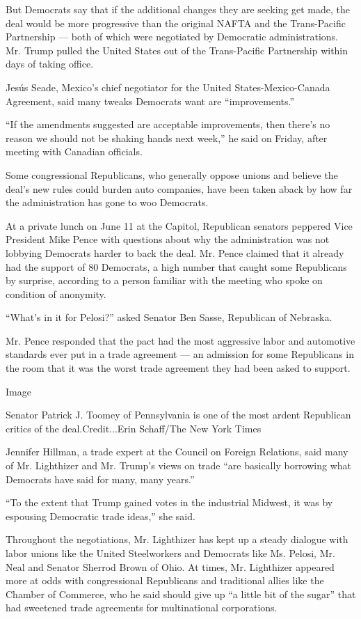 But Democrats say that if the additional changes they are seeking get
made, the deal would be more progressive than the original NAFTA and the
Trans-Pacific Partnership --- both of which were negotiated by
Democratic administrations. Mr. Trump pulled the United States out of
the Trans-Pacific Partnership within days of taking office.

Jesús Seade, Mexico's chief negotiator for the United
States-Mexico-Canada Agreement, said many tweaks Democrats want are
``improvements.''

``If the amendments suggested are acceptable improvements, then there's
no reason we should not be shaking hands next week,'' he said on Friday,
after meeting with Canadian officials.

Some congressional Republicans, who generally oppose unions and believe
the deal's new rules could burden auto companies, have been taken aback
by how far the administration has gone to woo Democrats.

At a private lunch on June 11 at the Capitol, Republican senators
peppered Vice President Mike Pence with questions about why the
administration was not lobbying Democrats harder to back the deal. Mr.
Pence claimed that it already had the support of 80 Democrats, a high
number that caught some Republicans by surprise, according to a person
familiar with the meeting who spoke on condition of anonymity.

``What's in it for Pelosi?'' asked Senator Ben Sasse, Republican of
Nebraska.

Mr. Pence responded that the pact had the most aggressive labor and
automotive standards ever put in a trade agreement --- an admission for
some Republicans in the room that it was the worst trade agreement they
had been asked to support.

Image

Senator Patrick J. Toomey of Pennsylvania is one of the most ardent
Republican critics of the deal.Credit...Erin Schaff/The New York Times

Jennifer Hillman, a trade expert at the Council on Foreign Relations,
said many of Mr. Lighthizer and Mr. Trump's views on trade ``are
basically borrowing what Democrats have said for many, many years.''

``To the extent that Trump gained votes in the industrial Midwest, it
was by espousing Democratic trade ideas,'' she said.

Throughout the negotiations, Mr. Lighthizer has kept up a steady
dialogue with labor unions like the United Steelworkers and Democrats
like Ms. Pelosi, Mr. Neal and Senator Sherrod Brown of Ohio. At times,
Mr. Lighthizer appeared more at odds with congressional Republicans and
traditional allies like the Chamber of Commerce, who he said should give
up ``a little bit of the sugar'' that had sweetened trade agreements for
multinational corporations.

